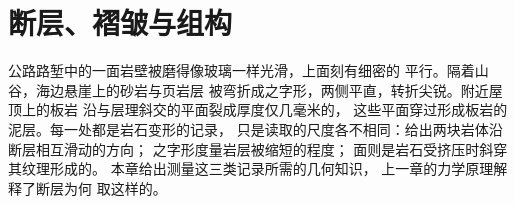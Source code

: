 \chapter{断层、褶皱与组构}\label{ch:b1:faults-folds-fabrics}

公路路堑中的一面岩壁被磨得像玻璃一样光滑，上面刻有细密的
平行。隔着山谷，海边悬崖上的砂岩与页岩层
被弯折成之字形，两侧平直，转折尖锐。附近屋顶上的板岩
沿与层理斜交的平面裂成厚度仅几毫米的，
这些平面穿过形成板岩的泥层。每一处都是岩石变形的记录，
只是读取的尺度各不相同：给出两块岩体沿断层相互滑动的方向；
之字形度量岩层被缩短的程度；
面则是岩石受挤压时斜穿其纹理形成的。
本章给出测量这三类记录所需的几何知识，
上一章的力学原理解释了断层为何
取这样的。


